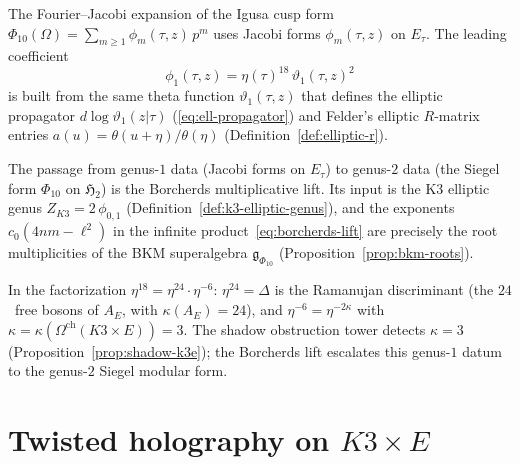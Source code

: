 \begin{proposition}
\label{prop:bridge-fj-genus-escalation}
The Fourier--Jacobi expansion of the Igusa cusp form
$\Phi_{10}(\Omega)
= \sum_{m \geq 1} \phi_m(\tau,z)\,p^m$
uses Jacobi forms $\phi_m(\tau,z)$ on $E_\tau$. The leading
coefficient
\begin{equation}\label{eq:bridge-phi-1}
\phi_1(\tau,z) = \eta(\tau)^{18}\,\vartheta_1(\tau,z)^2
\end{equation}
is built from the same theta function $\vartheta_1(\tau,z)$ that defines the
elliptic propagator $d\log\vartheta_1(z|\tau)$
\textup{(}\eqref{eq:ell-propagator}\textup{)} and
Felder's elliptic $R$-matrix entries $a(u) = \theta(u{+}\eta)/\theta(\eta)$
\textup{(}Definition~\textup{\ref{def:elliptic-r})}.

The passage from genus-$1$ data \textup{(}Jacobi forms on $E_\tau$\textup{)}
to genus-$2$ data \textup{(}the Siegel form $\Phi_{10}$ on $\mathfrak{H}_2$\textup{)}
is the Borcherds multiplicative lift. Its input is the K3 elliptic genus
$Z_{K3} = 2\,\phi_{0,1}$
\textup{(}Definition~\textup{\ref{def:k3-elliptic-genus})}, and the exponents
$c_0(4nm - \ell^2)$ in the infinite product~\eqref{eq:borcherds-lift} are precisely
the root multiplicities of the BKM superalgebra $\mathfrak{g}_{\Phi_{10}}$
\textup{(}Proposition~\textup{\ref{prop:bkm-roots})}.

In the factorization $\eta^{18} = \eta^{24} \cdot \eta^{-6}$:
$\eta^{24} = \Delta$ is the Ramanujan discriminant
\textup{(}the $24$~free bosons of $A_E$, with $\kappa(A_E) = 24$\textup{)}, and
$\eta^{-6} = \eta^{-2\kappa}$ with $\kappa = \kappa(\Omega^{\mathrm{ch}}(K3 \times E))
= 3$. The shadow obstruction tower detects $\kappa = 3$
\textup{(}Proposition~\textup{\ref{prop:shadow-k3e})};
the Borcherds lift escalates this genus-$1$ datum to the genus-$2$ Siegel modular form.
\end{proposition}



\section{Twisted holography on \texorpdfstring{$K3 \times E$}{K3 x E}}
\label{sec:twisted-holography-k3xe}

